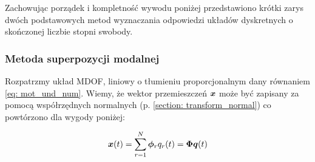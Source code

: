  Zachowując porządek i kompletność wywodu poniżej przedstawiono krótki zarys dwóch podstawowych metod wyznaczania odpowiedzi układów dyskretnych o skończonej liczbie stopni swobody.
 
 \subsubsection{Metoda superpozycji modalnej}
Rozpatrzmy układ MDOF, liniowy o tłumieniu proporcjonalnym dany równaniem \ref{eq: mot_und_num}. Wiemy, że wektor przemieszczeń $\bm{x}$ może być zapisany za pomocą współrzędnych normalnych (p. \ref{section: transform_normal}) co powtórzono dla wygody poniżej:

\begin{equation} \label{eq: superposition_modal_1_przytocz}
	\bm{x}(t) = \sum_{r=1}^{N} \bm{\phi}_r q_r(t)=\bm{\Phi q}(t)
\end{equation} 

